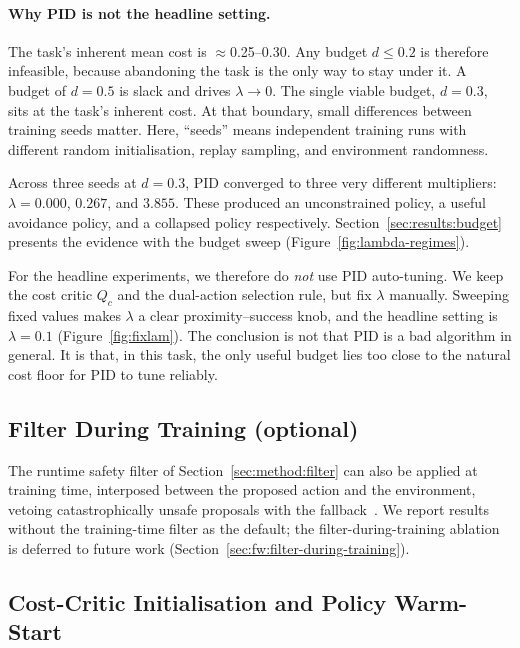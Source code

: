 \documentclass[11pt,a4paper]{report}
\begin{document}
\paragraph{Why PID is not the headline setting.}
The task's inherent mean cost is $\approx$0.25--0.30. Any budget
$d \le 0.2$ is therefore infeasible, because abandoning the task is the
only way to stay under it. A budget of $d = 0.5$ is slack and drives
$\lambda \to 0$. The single viable budget, $d = 0.3$, sits at the
task's inherent cost. At that boundary, small differences between
training seeds matter. Here, ``seeds'' means independent training runs
with different random initialisation, replay sampling, and environment
randomness.

Across three seeds at $d = 0.3$, PID converged to three very different
multipliers: $\lambda = 0.000$, $0.267$, and $3.855$. These produced an
unconstrained policy, a useful avoidance policy, and a collapsed policy
respectively. Section~\ref{sec:results:budget} presents the evidence
with the budget sweep (Figure~\ref{fig:lambda-regimes}).

For the headline experiments, we therefore do \emph{not} use PID
auto-tuning. We keep the cost critic $Q_c$ and the dual-action
selection rule, but fix $\lambda$ manually. Sweeping fixed values makes
$\lambda$ a clear proximity--success knob, and the headline setting is
$\lambda = 0.1$ (Figure~\ref{fig:fixlam}). The conclusion is not that
PID is a bad algorithm in general. It is that, in this task, the only
useful budget lies too close to the natural cost floor for PID to tune
reliably.

\subsection{Filter During Training (optional)}
\label{sec:method:lagrangian:filter-train}

The runtime safety filter of Section~\ref{sec:method:filter} can
also be applied at training time, interposed between the proposed
action and the environment, vetoing catastrophically unsafe
proposals with the fallback~\cite{cbfrl2024,shield2025}. We report
results without the training-time filter as the default; the
filter-during-training ablation is deferred to future work
(Section~\ref{sec:fw:filter-during-training}).

\subsection{Cost-Critic Initialisation and Policy Warm-Start}
\label{sec:method:lagrangian:warmstart}
\end{document}
